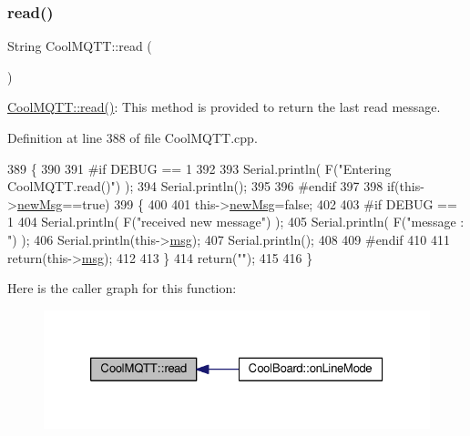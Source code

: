 \subsubsection{\texorpdfstring{read()}{read()}}
{\footnotesize\ttfamily String Cool\+M\+Q\+T\+T\+::read (\begin{DoxyParamCaption}{ }\end{DoxyParamCaption})}

\hyperlink{class_cool_m_q_t_t_ae3c18f6ae9723746d32765f1c8f176ca}{Cool\+M\+Q\+T\+T\+::read()}\+: This method is provided to return the last read message. 

Definition at line 388 of file Cool\+M\+Q\+T\+T.\+cpp.


\begin{DoxyCode}
389 \{   
390 
391 \textcolor{preprocessor}{#if DEBUG == 1 }
392 
393     Serial.println( F(\textcolor{stringliteral}{"Entering CoolMQTT.read()"}) );
394     Serial.println();
395 
396 \textcolor{preprocessor}{#endif }
397 
398     \textcolor{keywordflow}{if}(this->\hyperlink{class_cool_m_q_t_t_a3240388137b885775aadf38e96b24c6b}{newMsg}==\textcolor{keyword}{true})
399     \{
400         
401         this->\hyperlink{class_cool_m_q_t_t_a3240388137b885775aadf38e96b24c6b}{newMsg}=\textcolor{keyword}{false};
402 
403 \textcolor{preprocessor}{#if DEBUG == 1 }
404         Serial.println( F(\textcolor{stringliteral}{"received new message"}) );
405         Serial.println( F(\textcolor{stringliteral}{"message : "}) );
406         Serial.println(this->\hyperlink{class_cool_m_q_t_t_af6b19e7074dbbb4ae493c44dcb53f7ff}{msg});
407         Serial.println();
408 
409 \textcolor{preprocessor}{#endif}
410 
411         \textcolor{keywordflow}{return}(this->\hyperlink{class_cool_m_q_t_t_af6b19e7074dbbb4ae493c44dcb53f7ff}{msg});
412         
413     \}
414     \textcolor{keywordflow}{return}(\textcolor{stringliteral}{""});
415 
416 \}
\end{DoxyCode}
Here is the caller graph for this function\+:\nopagebreak
\begin{figure}[H]
\begin{center}
\leavevmode
\includegraphics[width=326pt]{d0/dd0/class_cool_m_q_t_t_ae3c18f6ae9723746d32765f1c8f176ca_icgraph}
\end{center}
\end{figure}
\mbox{\label{class_cool_m_q_t_t_a5d003307eff78efbd585e42b43b72b6d}} 
